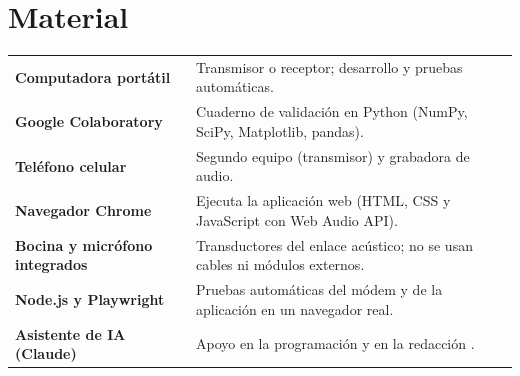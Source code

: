 \documentclass[10pt,twocolumn,letterpaper]{article}
\begin{document}
\section*{Material}
\noindent\begin{tabularx}{\linewidth}{@{}>{\bfseries}p{4.6cm}X@{}}
\toprule
Computadora portátil & Transmisor o receptor; desarrollo y pruebas automáticas. \\
Google Colaboratory & Cuaderno de validación en Python (NumPy, SciPy, Matplotlib, pandas). \\
Teléfono celular & Segundo equipo (transmisor) y grabadora de audio. \\
Navegador Chrome & Ejecuta la aplicación web (HTML, CSS y JavaScript con Web Audio API). \\
Bocina y micrófono integrados & Transductores del enlace acústico; no se usan cables ni módulos externos. \\
Node.js y Playwright & Pruebas automáticas del módem y de la aplicación en un navegador real. \\
Asistente de IA (Claude) & Apoyo en la programación y en la redacción \cite{claude}. \\
\bottomrule
\end{tabularx}
\end{document}
